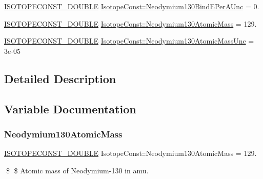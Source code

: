 \begin{DoxyCompactItemize}
\mbox{\hyperlink{group___isotope_const-_macros_ga8f45a7272ce02c0b4c65c44636ed719a}{I\+S\+O\+T\+O\+P\+E\+C\+O\+N\+S\+T\+\_\+\+D\+O\+U\+B\+LE}} \mbox{\hyperlink{group___isotope_const-_neodymium-_nd130_gaa3be072eb46d0db2b2c540971fe49cd4}{Isotope\+Const\+::\+Neodymium130\+Bind\+E\+Per\+A\+Unc}} = 0.
\item 
\mbox{\hyperlink{group___isotope_const-_macros_ga8f45a7272ce02c0b4c65c44636ed719a}{I\+S\+O\+T\+O\+P\+E\+C\+O\+N\+S\+T\+\_\+\+D\+O\+U\+B\+LE}} \mbox{\hyperlink{group___isotope_const-_neodymium-_nd130_ga760949adcafc080602e36e71c63c9347}{Isotope\+Const\+::\+Neodymium130\+Atomic\+Mass}} = 129.
\item 
\mbox{\hyperlink{group___isotope_const-_macros_ga8f45a7272ce02c0b4c65c44636ed719a}{I\+S\+O\+T\+O\+P\+E\+C\+O\+N\+S\+T\+\_\+\+D\+O\+U\+B\+LE}} \mbox{\hyperlink{group___isotope_const-_neodymium-_nd130_ga8798e2404179f73651a5f29a1e286645}{Isotope\+Const\+::\+Neodymium130\+Atomic\+Mass\+Unc}} = 3e-\/05
\end{DoxyCompactItemize}


\subsection{Detailed Description}


\subsection{Variable Documentation}
\mbox{\label{group___isotope_const-_neodymium-_nd130_ga760949adcafc080602e36e71c63c9347}} 
\subsubsection{\texorpdfstring{Neodymium130\+Atomic\+Mass}{Neodymium130AtomicMass}}
{\footnotesize\ttfamily \mbox{\hyperlink{group___isotope_const-_macros_ga8f45a7272ce02c0b4c65c44636ed719a}{I\+S\+O\+T\+O\+P\+E\+C\+O\+N\+S\+T\+\_\+\+D\+O\+U\+B\+LE}} Isotope\+Const\+::\+Neodymium130\+Atomic\+Mass = 129.}

\$ \$ Atomic mass of Neodymium-\/130 in amu. \mbox{\label{group___isotope_const-_neodymium-_nd130_ga8798e2404179f73651a5f29a1e286645}} 
